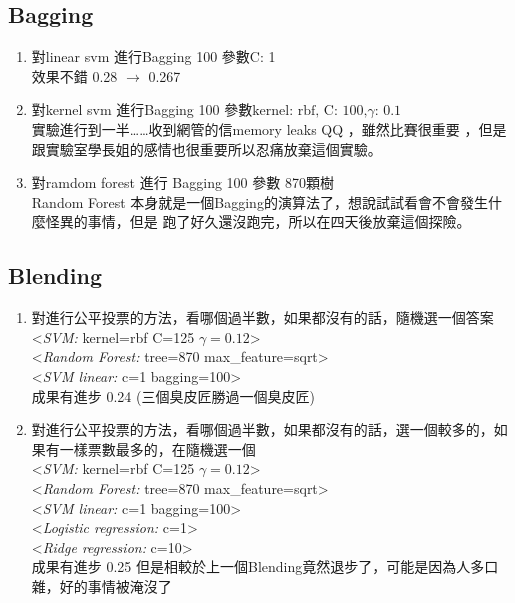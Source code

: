 \documentclass[12pt]{article}
\theoremstyle{definition}
\theoremstyle{remark}
\begin{document}
  \subsection{Bagging}
    \begin{enumerate}
      \item 對linear svm 進行Bagging 100 參數C: 1 \\
          效果不錯 0.28 $ \to $ 0.267
      \item 對kernel svm 進行Bagging 100  參數$ \text{kernel: rbf, C: 100,} \gamma \text{: 0.1} $\\
          實驗進行到一半\dots\dots 收到網管的信memory leaks QQ ，雖然比賽很重要
          ，但是跟實驗室學長姐的感情也很重要所以忍痛放棄這個實驗。
      \item 對ramdom forest 進行 Bagging 100 參數 870顆樹\\
          Random Forest 本身就是一個Bagging的演算法了，想說試試看會不會發生什麼怪異的事情，但是
          跑了好久還沒跑完，所以在四天後放棄這個探險。
    \end{enumerate}
  \subsection{Blending}
    \begin{enumerate}
      \item 對進行公平投票的方法，看哪個過半數，如果都沒有的話，隨機選一個答案\\
        <{\em SVM:\/} kernel=rbf C=125 $ \gamma = 0.12 $>\\ 
        <{\em Random Forest:\/} tree=870 max\_feature=sqrt> \\
        <{\em SVM linear:\/} c=1 bagging=100>\\
        成果有進步 0.24 (三個臭皮匠勝過一個臭皮匠)
      \item 對進行公平投票的方法，看哪個過半數，如果都沒有的話，選一個較多的，如果有一樣票數最多的，在隨機選一個\\
        <{\em SVM:\/} kernel=rbf C=125 $ \gamma = 0.12 $>\\ 
        <{\em Random Forest:\/} tree=870 max\_feature=sqrt> \\
        <{\em SVM linear:\/} c=1 bagging=100>\\
        <{\em Logistic regression:\/} c=1>\\
        <{\em Ridge regression:\/} c=10>\\
        成果有進步 0.25 但是相較於上一個Blending竟然退步了，可能是因為人多口雜，好的事情被淹沒了
    \end{enumerate}
\end{document}
